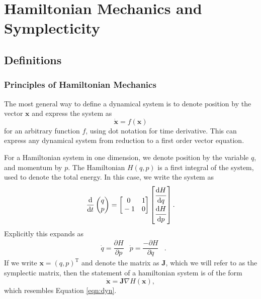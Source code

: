 \documentclass{report}
\begin{document}
\chapter{Hamiltonian Mechanics and Symplecticity}

\section{Definitions}

\subsection{Principles of Hamiltonian Mechanics}

The most general way to define a dynamical system is to denote position by the vector $\mathbf{x}$ and express the system as
\begin{equation}
	\mathbf{\dot{x}} = f(\mathbf{x})
	\label{eqn:dyn}
\end{equation}
for an arbitrary function $f$, using dot notation for time derivative.
This can express any dynamical system from reduction to a first order vector equation.

For a Hamiltonian system in one dimension, we denote position by the variable $q$, and momentum by $p$.
The Hamiltonian $H(q,p)$ is a first integral of the system, used to denote the total energy.
In this case, we write the system as
\begin{equation}
	\dfrac{\mathrm{d}}{\mathrm{d}t}\begin{pmatrix}
		q \\
		p
	\end{pmatrix} = \begin{bmatrix}
		\strut 0 & \strut 1 \\
		\strut -1 & \strut 0
	\end{bmatrix}\begin{bmatrix}
	\dfrac{\strut\mathrm{d}H}{\strut\mathrm{d}q} \\
	\dfrac{\strut\mathrm{d}H}{\strut\mathrm{d}p}
	\end{bmatrix}.
\end{equation}
Explicitly this expands as
\begin{align*}
	&\dot{q} = \dfrac{\partial H}{\partial p}
	&
	\dot{p} = \dfrac{-\partial H}{\partial q}&.	
\end{align*}
If we write $\mathbf{x} = (q,p)^\mathrm{T}$ and denote the matrix as $\mathbf{J}$, which we will refer to as the symplectic matrix,
then the statement of a hamiltonian system is of the form 
\begin{equation}
	\mathbf{\dot{x}} = \mathbf{J}\nabla H(\mathbf{x}),
\end{equation}
which resembles Equation \ref{eqn:dyn}.
\end{document}
